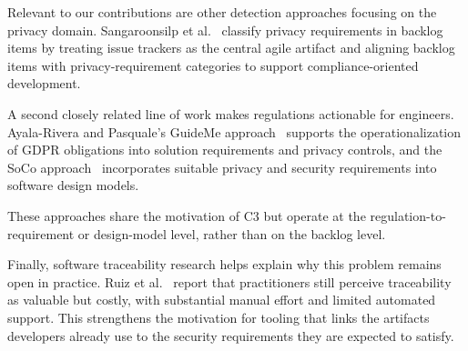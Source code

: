 Relevant to our contributions are other detection approaches focusing on the privacy domain.
Sangaroonsilp et al.~\cite{sangaroonsilp2023privacy-issue-reports} classify privacy requirements in backlog items by treating issue trackers as the central agile artifact and aligning backlog items with privacy-requirement categories to support compliance-oriented development.

A second closely related line of work makes regulations actionable for engineers.
Ayala-Rivera and Pasquale's GuideMe approach~\cite{ayala-rivera2018grace-period} supports the operationalization of GDPR obligations into solution requirements and privacy controls, and the SoCo approach~\cite{ayala-rivera2024soco} incorporates suitable privacy and security requirements into software design models.

These approaches share the motivation of C3 but operate at the regulation-to-requirement or design-model level, rather than on the backlog level.

Finally, software traceability research helps explain why this problem remains open in practice.
Ruiz et al.~\cite{ruiz2023traceability} report that practitioners still perceive traceability as valuable but costly, with substantial manual effort and limited automated support.
This strengthens the motivation for tooling that links the artifacts developers already use to the security requirements they are expected to satisfy.